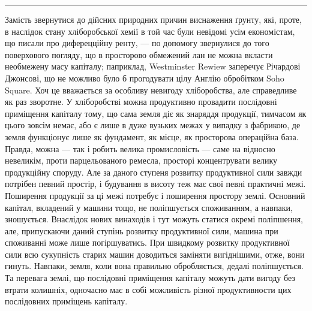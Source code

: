 \pfbreak

Замість звернутися до дійсних природних причин виснаження ґрунту, які,
проте, в наслідок стану хліборобської хемії в той час були невідомі усім економістам,
що писали про диферецційну ренту, — по допомогу звернулися до того
поверхового погляду, що в просторово обмежений лан не можна вкласти необмежену
масу капіталу; паприклад, Westminster Rewiew заперечує Річардові
Джонсові, що не можливо було б прогодувати цілу Англію обробітком Soho Square.
Хоч це вважається за особливу невигоду хліборобства, але справедливе як раз
зворотне. У хліборобстві можна продуктивно провадити послідовні приміщення
капіталу тому, що сама земля діє як знаряддя продукції, тимчасом як цього зовсім
немає, або є лише в дуже вузьких межах у випадку з фабрикою, де земля
функціонує лише як фундамент, як місце, як просторова операційна база. Правда,
можна — так і робить велика промисловість — саме на відносно невеликім, проти
парцельованого ремесла, просторі концентрувати велику продукційну споруду.
Але за даного ступеня розвитку продуктивної сили завжди потрібен певний простір,
і будування в висоту теж має свої певні практичні межі. Поширення продукції
за ці межі потребує і поширення простору землі. Основний капітал, вкладений
у машини тощо, не поліпшується споживанням, а навпаки, зношується. Внаслідок
нових винаходів і тут можуть статися окремі поліпшення, але, припускаючи
даний ступінь розвитку продуктивної сили, машина при споживанні може
лише погіршуватись. При швидкому розвитку продуктивної сили всю сукупність
старих машин доводиться заміняти вигіднішими, отже, вони гинуть. Навпаки,
земля, коли вона правильно обробляється, дедалі поліпшується. Та перевага
землі, що послідовні приміщення капіталу можуть дати вигоду без втрати колишніх,
одночасно має в собі можливість різної продуктивности цих послідовних
приміщень капіталу.


